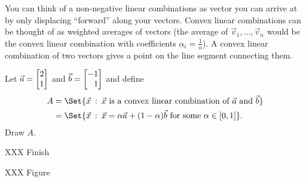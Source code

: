
You can think of a non-negative linear combinations as vector you can arrive at by
only displacing ``forward'' along your vectors.
Convex linear combinations can be thought of as weighted averages of vectors (the average of $\vec v_1,\ldots,
\vec v_n$ would be the convex linear combination with coefficients $\alpha_i=\frac{1}{n}$). 
A convex linear combination
of two vectors gives a point on the line segment connecting them. 

\begin{example}
	Let $\vec a=\mat{2\\1}$ and $\vec b=\mat{-1\\1}$ and define
	\begin{align*}
		A&=\Set{\vec x\given \vec x\text{ is a convex linear combination of }\vec a\text{ and }\vec b}\\
		&=\Set{\vec x\given \vec x=\alpha\vec a+(1-\alpha)\vec b\text{ for some }\alpha\in [0,1]}.
	\end{align*}
	Draw $A$.

	XXX Finish

	XXX Figure
\end{example}

